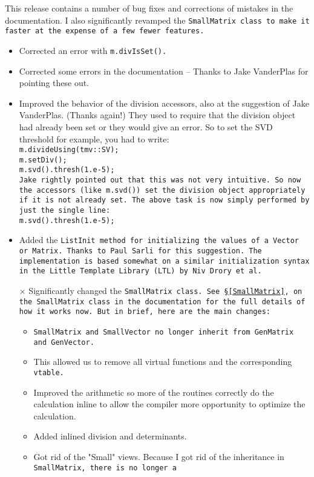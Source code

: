 \begin{description}
This release contains a number of bug fixes and corrections of mistakes in the documentation.
I also significantly revamped the \tt{SmallMatrix} class to make it faster at the expense of a few fewer 
features.  
\begin{itemize}
\item
Corrected an error with \tt{m.divIsSet()}.
\item
Corrected some errors in the documentation -- Thanks to Jake VanderPlas for pointing these out.
\item
Improved the behavior of the division accessors, also at the suggestion of Jake VanderPlas. (Thanks again!)  They used to require that the division
object had already been set or they would give an error.  So to set the SVD threshold for example,
you had to write:\\
\tt{m.divideUsing(tmv::SV);}\\
\tt{m.setDiv();}\\
\tt{m.svd().thresh(1.e-5);}\\
Jake rightly pointed out that this was not very intuitive.  So now the accessors (like \tt{m.svd()}) set
the division object appropriately if it is not already set.  The above task is now simply performed
by just the single line:\\
\tt{m.svd().thresh(1.e-5);}
\item
Added the \tt{ListInit} method for initializing the values of a \tt{Vector} or \tt{Matrix}.  Thanks to Paul
Sarli for this suggestion.  The implementation is based somewhat on a similar 
initialization syntax in the Little Template Library (LTL) by Niv Drory et al.
\item[$\times$]
Significantly changed the \tt{SmallMatrix} class.  See \S\ref{SmallMatrix}, on the \tt{SmallMatrix} class 
in the documentation
for the full details of how it works now.  But in brief, here are the main changes:
\begin{itemize}
\item \tt{SmallMatrix} and \tt{SmallVector} no longer inherit from \tt{GenMatrix} and \tt{GenVector}.
\item This allowed us to remove all virtual functions and the corresponding \tt{vtable}.
\item Improved the arithmetic so more of the routines correctly do the calculation inline to allow the
compiler more opportunity to optimize the calculation.
\item Added inlined division and determinants.
\item Got rid of the "Small" views.  Because I got rid of the inheritance in \tt{SmallMatrix}, there is no longer a 

\end{itemize}
\end{itemize}
\end{description}
